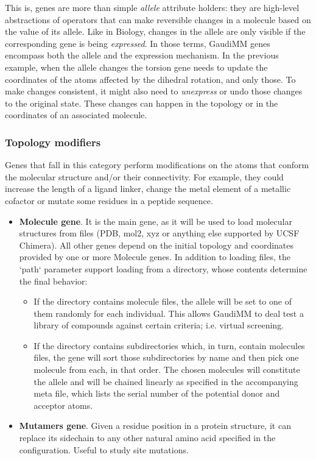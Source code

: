 This is, genes are more than simple \textit{allele} attribute holders: they are high-level abstractions of operators that can make reversible changes in a molecule based on the value of its allele. Like in Biology, changes in the allele are only visible if the corresponding gene is being \textit{expressed}. In those terms, GaudiMM genes encompass both the allele and the expression mechanism. In the previous example, when the allele changes the torsion gene needs to update the coordinates of the atoms affected by the dihedral rotation, and only those. To make changes consistent, it might also need to \textit{unexpress} or undo those changes to the original state. These changes can happen in the topology or in the coordinates of an associated molecule.

\subsubsection{Topology modifiers}
Genes that fall in this category perform modifications on the atoms that conform the molecular structure and/or their connectivity. For example, they could increase the length of a ligand linker, change the metal element of a metallic cofactor or mutate some residues in a peptide sequence.

\begin{itemize}
	\item \textbf{Molecule gene}. It is the main gene, as it will be used to load molecular structures from files (PDB, mol2, xyz or anything else supported by UCSF Chimera). All other genes depend on the initial topology and coordinates provided by one or more Molecule genes. In addition to loading files, the `path` parameter support loading from a directory, whose contents determine the final behavior:

\begin{itemize}
	\item If the directory contains molecule files, the allele will be set to one of them randomly for each individual. This allows GaudiMM to deal test a library of compounds against certain criteria; i.e. virtual screening.

	\item If the directory contains subdirectories which, in turn, contain molecules files, the gene will sort those subdirectories by name and then pick one molecule from each, in that order. The chosen molecules will constitute the allele and will be chained linearly as specified in the accompanying meta file, which lists the serial number of the potential donor and acceptor atoms.


\end{itemize}
	\item \textbf{Mutamers gene}. Given a residue position in a protein structure, it can replace its sidechain to any other natural amino acid specified in the configuration. Useful to study site mutations.
\end{itemize}

